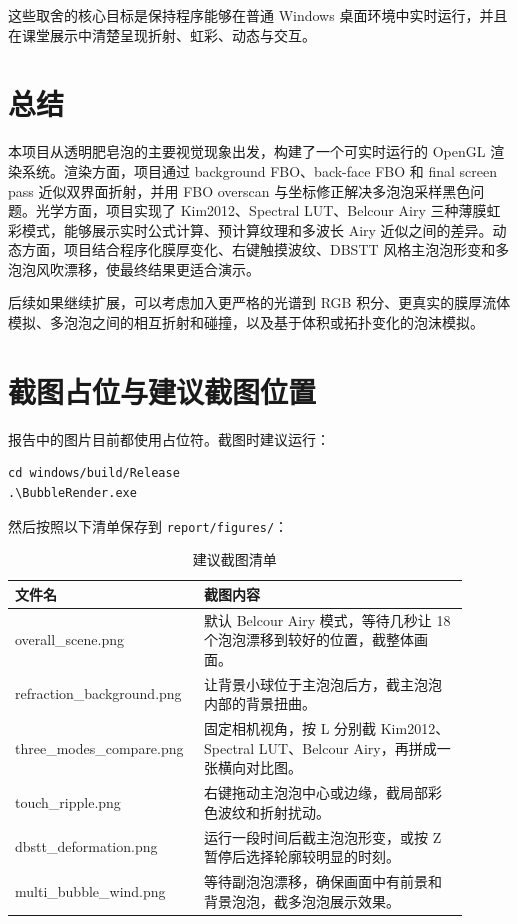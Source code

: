 \documentclass[UTF8,a4paper,11pt]{ctexart}
\newcommand{\codepath}[1]{\texttt{#1}}
\begin{document}
这些取舍的核心目标是保持程序能够在普通 Windows 桌面环境中实时运行，并且在课堂展示中清楚呈现折射、虹彩、动态与交互。

\section{总结}

本项目从透明肥皂泡的主要视觉现象出发，构建了一个可实时运行的 OpenGL 渲染系统。渲染方面，项目通过 background FBO、back-face FBO 和 final screen pass 近似双界面折射，并用 FBO overscan 与坐标修正解决多泡泡采样黑色问题。光学方面，项目实现了 Kim2012、Spectral LUT、Belcour Airy 三种薄膜虹彩模式，能够展示实时公式计算、预计算纹理和多波长 Airy 近似之间的差异。动态方面，项目结合程序化膜厚变化、右键触摸波纹、DBSTT 风格主泡泡形变和多泡泡风吹漂移，使最终结果更适合演示。

后续如果继续扩展，可以考虑加入更严格的光谱到 RGB 积分、更真实的膜厚流体模拟、多泡泡之间的相互折射和碰撞，以及基于体积或拓扑变化的泡沫模拟。

\appendix
\section{截图占位与建议截图位置}

报告中的图片目前都使用占位符。截图时建议运行：

\begin{lstlisting}
cd windows/build/Release
.\BubbleRender.exe
\end{lstlisting}

然后按照以下清单保存到 \codepath{report/figures/}：

\begin{table}[H]
  \centering
  \caption{建议截图清单}
  \begin{tabular}{>{\ttfamily}p{0.34\linewidth}p{0.56\linewidth}}
    \toprule
    文件名 & 截图内容 \\
    \midrule
    overall\_scene.png & 默认 Belcour Airy 模式，等待几秒让 18 个泡泡漂移到较好的位置，截整体画面。\\
    refraction\_background.png & 让背景小球位于主泡泡后方，截主泡泡内部的背景扭曲。\\
    three\_modes\_compare.png & 固定相机视角，按 L 分别截 Kim2012、Spectral LUT、Belcour Airy，再拼成一张横向对比图。\\
    touch\_ripple.png & 右键拖动主泡泡中心或边缘，截局部彩色波纹和折射扰动。\\
    dbstt\_deformation.png & 运行一段时间后截主泡泡形变，或按 Z 暂停后选择轮廓较明显的时刻。\\
    multi\_bubble\_wind.png & 等待副泡泡漂移，确保画面中有前景和背景泡泡，截多泡泡展示效果。\\
    \bottomrule
  \end{tabular}
\end{table}



\end{document}
